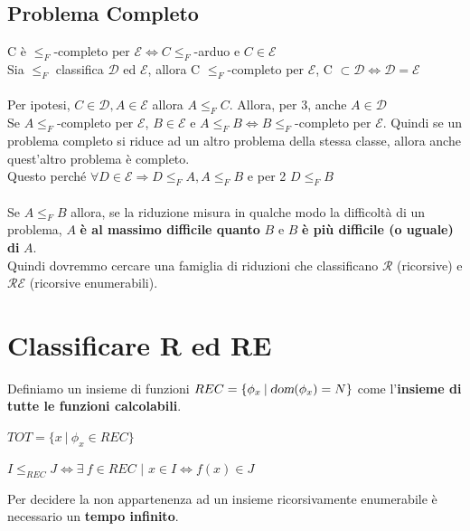 \documentclass[10pt]{book}
\begin{document}
\subsection{Problema Completo}
C è $\leq_F$-completo per $\mathscr{E} \Leftrightarrow C \leq_F$-arduo e $C \in \mathscr{E}$\\
Sia $\leq_F$ classifica $\mathscr{D}$ ed $\mathscr{E}$, allora C $\leq_F$-completo per $\mathscr{E}$, C $\subset \mathscr{D} \Leftrightarrow \mathscr{D} = \mathscr{E}$\\\\
Per ipotesi, $C \in \mathscr{D}, A \in \mathscr{E}$ allora $A \leq_F C$. Allora, per 3, anche $A \in \mathscr{D}$\\
Se $A \leq_F$-completo per $\mathscr{E}$, $B \in \mathscr{E}$ e $A \leq_F B \Leftrightarrow B \leq_F$-completo per $\mathscr{E}$. Quindi se un problema completo si riduce ad un altro problema della stessa classe, allora anche quest'altro problema è completo.\\
Questo perché $\forall D \in \mathscr{E} \Rightarrow D \leq_F A, A \leq_F B$ e per 2 $D \leq_F B$\\\\
Se $A \leq_F B$ allora, se la riduzione misura in qualche modo la difficoltà di un problema, $A$ \textbf{è al massimo difficile quanto} $B$ e $B$ \textbf{è più difficile (o uguale) di} $A$.\\
Quindi dovremmo cercare una famiglia di riduzioni che classificano $\mathscr{R}$ (ricorsive) e $\mathscr{RE}$ (ricorsive enumerabili).
\section{Classificare R ed RE}
Definiamo un insieme di funzioni $REC = \{\phi_x\:|\:\textsl{dom}(\phi_x) = N\}$ come l'\textbf{insieme di tutte le funzioni calcolabili}.
\begin{list}{}{}
	\item $TOT = \{x\:|\:\phi_x \in REC\}$
	\item $I \leq_{REC} J \Leftrightarrow \exists\: f \in REC$ $|$ $x \in I \Leftrightarrow f(x) \in J$
\end{list}
Per decidere la non appartenenza ad un insieme ricorsivamente enumerabile è necessario un \textbf{tempo infinito}.
\pagebreak
\end{document}
